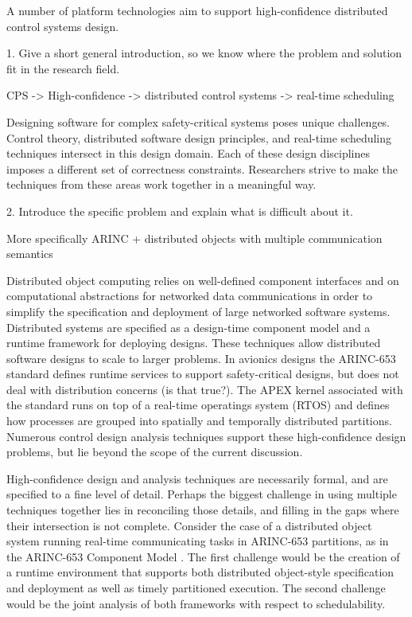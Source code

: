 
A number of platform technologies aim to support high-confidence distributed
control systems design.

1. Give a short general introduction, so we know where the problem and solution
   fit in the research field.

CPS -> High-confidence -> distributed control systems -> real-time scheduling

Designing software for complex safety-critical systems poses unique challenges. 
Control theory, distributed software design principles, and real-time scheduling
techniques intersect in this design domain.  Each of these design disciplines 
imposes a different set of correctness constraints.  Researchers strive to make
the techniques from these areas work together in a meaningful way.

2. Introduce the specific problem and explain what is difficult about it.

More specifically 
ARINC + distributed objects with multiple communication semantics

Distributed object computing relies on well-defined component interfaces and 
on computational abstractions for networked data communications in order to 
simplify the specification and deployment of large networked software systems.
Distributed systems are specified as a design-time component model and a 
runtime framework for deploying designs.  These techniques allow distributed 
software designs to scale to larger problems.   In avionics designs the 
ARINC-653 standard defines runtime services to support safety-critical designs,
but does not deal with distribution concerns (is that true?).  The APEX kernel 
associated with the standard runs on top of a real-time operatings system (RTOS)
and defines how processes are grouped into spatially and temporally distributed 
partitions. Numerous control design analysis techniques support these 
high-confidence design problems, but lie beyond the scope of the current 
discussion.  

High-confidence design and analysis techniques are necessarily formal, and are 
specified to a fine level of detail.  Perhaps the biggest challenge in using
multiple techniques together lies in reconciling those details, and filling in 
the gaps where their intersection is not complete.  Consider the case of a
distributed object system running real-time communicating tasks in ARINC-653
partitions, as in the ARINC-653 Component Model \cite{}.  The first challenge
would be the creation of a runtime environment that supports both distributed
object-style specification and deployment as well as timely partitioned 
execution. The second challenge would be the joint analysis of both frameworks 
with respect to schedulability.  

